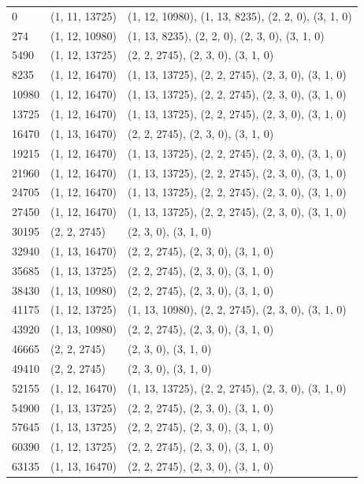 \documentclass[msc,oneside]{ubcthesis}
\theoremstyle{definition}
\begin{document}
\begin{center}
\begin{longtable}{|l|l|l|}
    0 & (1, 11, 13725) & (1, 12, 10980), (1, 13, 8235), (2, 2, 0), (3, 1, 0) \\
    274 & (1, 12, 10980) & (1, 13, 8235), (2, 2, 0), (2, 3, 0), (3, 1, 0) \\
    5490 & (1, 12, 13725) & (2, 2, 2745), (2, 3, 0), (3, 1, 0) \\
    8235 & (1, 12, 16470) & (1, 13, 13725), (2, 2, 2745), (2, 3, 0), (3, 1, 0) \\
    10980 & (1, 12, 16470) & (1, 13, 13725), (2, 2, 2745), (2, 3, 0), (3, 1, 0) \\
    13725 & (1, 12, 16470) & (1, 13, 13725), (2, 2, 2745), (2, 3, 0), (3, 1, 0) \\
    16470 & (1, 13, 16470) & (2, 2, 2745), (2, 3, 0), (3, 1, 0) \\
    19215 & (1, 12, 16470) & (1, 13, 13725), (2, 2, 2745), (2, 3, 0), (3, 1, 0) \\
    21960 & (1, 12, 16470) & (1, 13, 13725), (2, 2, 2745), (2, 3, 0), (3, 1, 0) \\
    24705 & (1, 12, 16470) & (1, 13, 13725), (2, 2, 2745), (2, 3, 0), (3, 1, 0) \\
    27450 & (1, 12, 16470) & (1, 13, 13725), (2, 2, 2745), (2, 3, 0), (3, 1, 0) \\
    30195 & (2, 2, 2745) & (2, 3, 0), (3, 1, 0) \\
    32940 & (1, 13, 16470) & (2, 2, 2745), (2, 3, 0), (3, 1, 0) \\
    35685 & (1, 13, 13725) & (2, 2, 2745), (2, 3, 0), (3, 1, 0) \\
    38430 & (1, 13, 10980) & (2, 2, 2745), (2, 3, 0), (3, 1, 0) \\
    41175 & (1, 12, 13725) & (1, 13, 10980), (2, 2, 2745), (2, 3, 0), (3, 1, 0) \\
    43920 & (1, 13, 10980) & (2, 2, 2745), (2, 3, 0), (3, 1, 0) \\
    46665 & (2, 2, 2745) & (2, 3, 0), (3, 1, 0) \\
    49410 & (2, 2, 2745) & (2, 3, 0), (3, 1, 0) \\
    52155 & (1, 12, 16470) & (1, 13, 13725), (2, 2, 2745), (2, 3, 0), (3, 1, 0) \\
    54900 & (1, 13, 13725) & (2, 2, 2745), (2, 3, 0), (3, 1, 0) \\
    57645 & (1, 13, 13725) & (2, 2, 2745), (2, 3, 0), (3, 1, 0) \\
    60390 & (1, 12, 13725) & (2, 2, 2745), (2, 3, 0), (3, 1, 0) \\
    63135 & (1, 13, 16470) & (2, 2, 2745), (2, 3, 0), (3, 1, 0) \\

\end{longtable}
\end{center}
\end{document}
